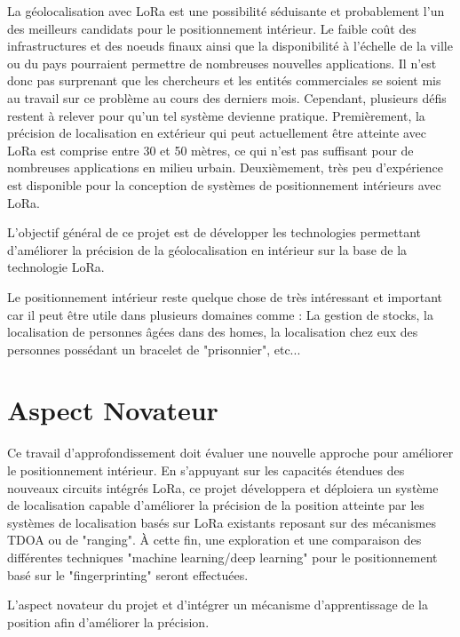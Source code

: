 La géolocalisation avec LoRa est une possibilité séduisante et probablement l'un des meilleurs candidats pour le positionnement intérieur. Le faible coût des infrastructures et des noeuds finaux ainsi que la disponibilité à l'échelle de la ville ou du pays pourraient permettre de nombreuses nouvelles applications. Il n’est donc pas surprenant que les chercheurs et les entités commerciales se soient mis au travail sur ce problème au cours des derniers mois. Cependant, plusieurs défis restent à relever pour qu'un tel système devienne pratique.
Premièrement, la précision de localisation en extérieur qui peut actuellement être atteinte avec LoRa est comprise entre 30 et 50 mètres, ce qui n’est pas suffisant pour de nombreuses applications en milieu urbain. Deuxièmement, très peu d’expérience est disponible pour la conception de systèmes de positionnement intérieurs avec LoRa.

L’objectif général de ce projet est de développer les technologies permettant d'améliorer la précision de la géolocalisation en intérieur sur la base de la technologie LoRa. 

Le positionnement intérieur reste quelque chose de très intéressant et important car il peut être utile dans plusieurs domaines comme : La gestion de stocks, la localisation de personnes âgées dans des homes, la localisation chez eux des personnes possédant un bracelet de "prisonnier", etc...

\section{Aspect Novateur}
Ce travail d'approfondissement doit évaluer une nouvelle approche pour améliorer le positionnement intérieur. En s'appuyant sur les capacités étendues des nouveaux circuits intégrés LoRa, ce projet développera et déploiera un système de localisation capable d'améliorer la précision de la position atteinte par les systèmes de localisation basés sur LoRa existants reposant sur des mécanismes TDOA ou de "ranging". À cette fin, une exploration et une comparaison des différentes techniques "machine learning/deep learning" pour le positionnement basé sur le "fingerprinting" seront effectuées.

L'aspect novateur du projet et d'intégrer un mécanisme d'apprentissage de la position afin d'améliorer la précision. 


